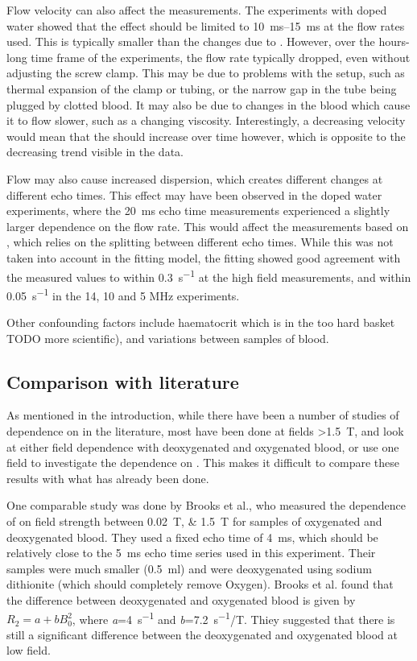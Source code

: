 Flow velocity can also affect the \Ttwo measurements.
The experiments with doped water showed that the effect should be limited to \SIrange{10}{15}{ms} at the flow rates used.
This is typically smaller than the changes due to \SOtwo.
However, over the hours-long time frame of the experiments, the flow rate typically dropped, even without adjusting the screw clamp.
This may be due to problems with the setup, such as thermal expansion of the clamp or tubing, or the narrow gap in the tube being plugged by clotted blood.
It may also be due to changes in the blood which cause it to flow slower, such as a changing viscosity.
Interestingly, a decreasing velocity would mean that the \Ttwo should increase over time however, which is opposite to the decreasing trend visible in the data.

Flow may also cause increased dispersion, which creates different \Ttwo changes at different echo times.
This effect may have been observed in the doped water experiments, where the \SI{20}{ms} echo time \Ttwo measurements experienced a slightly larger dependence on the flow rate.
This would affect the measurements based on \Kzero, which relies on the splitting between different echo times.
While this was not taken into account in the fitting model, the \Kzero fitting showed good agreement with the measured \Rtwo values to within \SI{0.3}{s^{-1}} at the high field measurements, and within \SI{0.05}{s^{-1}} in the 14, 10 and 5 MHz experiments.

Other confounding factors include haematocrit which is in the too hard basket TODO more scientific), and variations between samples of blood.

\subsection{Comparison with literature}
As mentioned in the introduction, while there have been a number of studies of \Ttwo dependence on \SOtwo in the literature, most have been done at fields \SI{>1.5}{T}, and look at either field dependence with deoxygenated and oxygenated blood, or use one field to investigate the dependence on \SOtwo.
This makes it difficult to compare these results with what has already been done.

One comparable study was done by Brooks et al., who measured the dependence of \Ttwo on field strength between \SIlist{0.02;1.5}{T} for samples of oxygenated and deoxygenated blood\cite{BrooksComparisont2relaxation1995}.
They used a fixed echo time of \SI{4}{ms}, which should be relatively close to the \SI{5}{ms} echo time series used in this experiment.
Their samples were much smaller (\SI{0.5}{ml}) and were deoxygenated using sodium dithionite (which should completely remove Oxygen).
Brooks et al. found that the difference between deoxygenated and oxygenated blood is given by $R_2 = a + bB_0^2$, where \textit{a}=\SI{4}{s^{-1}} and \textit{b}=\SI{7.2}{s^{-1}/T}.
Thiey suggested that there is still a significant difference between the deoxygenated and oxygenated blood at low field.

